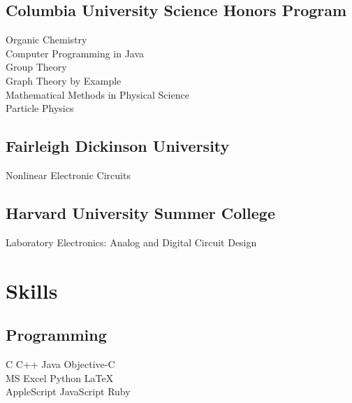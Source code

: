 \documentclass[letterpaper]{deedy-resume} %
\begin{document}
\begin{minipage}[t]{0.39\textwidth}
\subsection{Columbia University Science Honors Program}
Organic Chemistry \\
Computer Programming in Java \\
Group Theory \\
Graph Theory by Example \\
Mathematical Methods in Physical Science \\
Particle Physics \\

\sectionspace %


\subsection{Fairleigh Dickinson University}
Nonlinear Electronic Circuits \\

\sectionspace %


\subsection{Harvard University Summer College}
Laboratory Electronics: Analog and Digital Circuit Design \\

\sectionspace %


\section{Skills}

\subsection{Programming}

C \textbullet{} C++ \textbullet{} Java \textbullet{} Objective-C \\
MS Excel \textbullet{} Python \textbullet{} \LaTeX\\ 
AppleScript \textbullet{} JavaScript \textbullet{} Ruby \\


\end{minipage}
\end{document}
